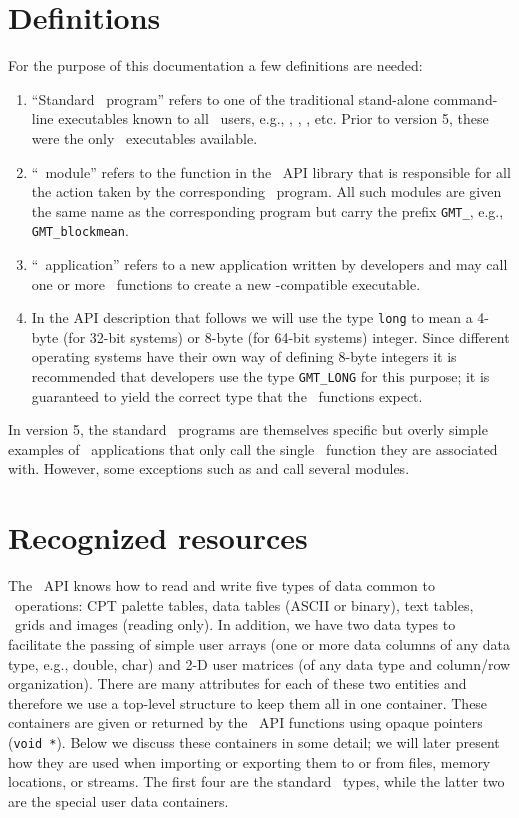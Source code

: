 \documentclass{report}
\begin{document}
\section{Definitions}

For the purpose of this documentation a few definitions are needed:

\begin{enumerate}
\item ``Standard \GMT\ program'' refers to one of the traditional stand-alone command-line
executables known to all \GMT\ users, e.g., , ,
, etc.  Prior to version 5, these were the only \GMT\ executables available.
\item ``\GMT\ module'' refers to the function in the \GMT\ API
library that is responsible for all the action taken by the corresponding \GMT\ program.  All
such modules are given the same name as the corresponding program but carry the
prefix \texttt{GMT\_}, e.g., \texttt{GMT\_blockmean}.
\item ``\GMT\ application'' refers to a new application written by developers
and may call one or more \GMT\ functions to create a new \GMT-compatible executable.
\item In the API description that follows we will use the type \texttt{long} to mean
a 4-byte (for 32-bit systems) or 8-byte (for 64-bit systems) integer.  Since different
operating systems have their own way of defining 8-byte integers it is recommended that
developers use the type \texttt{GMT\_LONG} for this purpose; it is guaranteed to yield
the correct type that the \GMT\ functions expect.
\end{enumerate}
In version 5, the standard \GMT\ programs are themselves specific but overly simple examples
of \GMT\ applications that only call the single \GMT\ function they are associated with.
However, some exceptions such as  and  call several modules.

\section{Recognized resources}

The \GMT\ API knows how to read and write five types of data common to \GMT\ operations:
CPT palette tables, data tables (ASCII or binary), text tables, \GMT\ grids and images (reading only).
In addition, we have two data types to facilitate the passing of simple user arrays (one or more data columns
of any data type, e.g., double, char) and 2-D user matrices (of any data type and column/row organization).
There are many attributes for each of these two entities and therefore we use a top-level structure
to keep them all in one container.  These containers are given or returned by the \GMT\ API
functions using opaque pointers (\texttt{void *}).  Below we discuss these containers in some detail; we
will later present how they are used when importing or exporting them to or from files,
memory locations, or streams.  The first four are the standard \GMT\ types, while the latter two are the
special user data containers.
\end{document}
